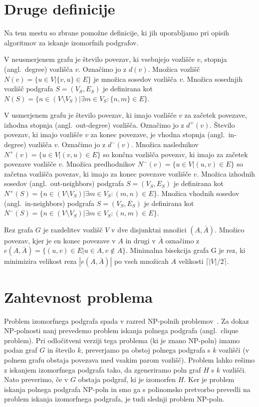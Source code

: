 \documentclass[a4paper, 12pt, ]{book}
\begin{document}
	\section{Druge definicije}

	Na tem mestu so zbrane pomožne definicije, ki jih uporabljamo pri opisih algoritmov za iskanje izomorfnih podgrafov.

	V neusmerjenem grafu je število povezav, ki vsebujejo vozlišče $v$, stopnja (angl.~degree) vozlišča $v$. Označimo jo z $d(v)$. Množica vozlišč
	$N(v) = \{u \in V \big| \{v, u\} \in E\}$ je množica sosedov vozlišča $v$. 
	Množica sosednjih vozlišč podgrafa $S = (V_S, E_S)$ je definirana kot 
	$N(S) = \{ n \in (V \setminus V_S) \big| \exists m \in V_S : \{n,m\} \in E \}$. 

	V usmerjenem grafu je število povezav, ki imajo vozlišče $v$ za začetek
	povezave, 	izhodna stopnja (angl.~out-degree) vozlišča. Označimo jo z $d^+(v)$.
	Število povezav, ki imajo vozlišče $v$ za konec povezave, je vhodna stopnja (angl.~in-degree) vozlišča $v$. Označimo jo z $d^-(v)$.
	Množica naslednikov
	$N^+(v) = \{u \in V \big| (v,u) \in E\}$
	so končna vozlišča povezav, ki imajo za začetek povezave vozlišče $v$.
	Množica predhodnikov 
	$N^-(v) = \{u \in V \big| (u,v) \in E\}$
	so začetna vozlišča povezav, ki imajo za konec povezave vozlišče $v$. 
	Množica izhodnih sosedov (angl.~out-neighbors) podgrafa $S = (V_S, E_S)$ je definirana kot 
	$N^+(S) = \{ n \in (V \setminus V_S) \big| \exists m \in V_S : (m,n) \in E \}$.
	Množica vhodnih sosedov (angl.~in-neighbors) podgrafa $S = (V_S, E_S)$ je definirana kot 
	$N^-(S) = \{ n \in (V \setminus V_S) \big| \exists m \in V_S : (n,m) \in E \}$.

	Rez grafa $G$ je razdelitev vozlišč $V$ v dve disjunktni množici $(A, \bar A)$. Množico povezav, kjer je en konec povezave v $A$ in drugi v
	 $\bar A$ označimo z $e(A, \bar A) = \{(u,v) \in E \big| u \in A, v \not \in A\}$. Minimalna bisekcija  grafa G je rez, ki minimizira velikost reza 
	$| e(A, \bar A) |$ po vseh množicah $A$ velikosti $\lceil | V | / 2 \rceil$.



	\section{Zahtevnost problema}
	Problem izomorfnega podgrafa spada v razred NP-polnih problemov~\cite{npcomplete}. Za dokaz NP-polnosti nanj prevedemo problem
	iskanja polnega podgrafa (angl.~clique problem). Pri odločitveni verziji tega problema (ki je znano NP-poln) imamo podan graf $G$ in število $k$,
	preverjamo pa obstoj polnega podgrafa s $k$ vozlišči (v polnem grafu obstaja povezava med vsakim parom vozlišč). Problem lahko rešimo z iskanjem
	izomorfnega podgrafa tako, da zgeneriramo poln graf $H$ s $k$ vozlišči. Nato preverimo, če v $G$ obstaja podgraf, ki je izomorfen $H$. Ker
	je problem iskanja polnega podgrafa NP-poln in smo ga s polinomsko pretvorbo prevedli na problem iskanja izomorfnega podgrafa, je tudi slednji
	problem NP-poln.
\end{document}
